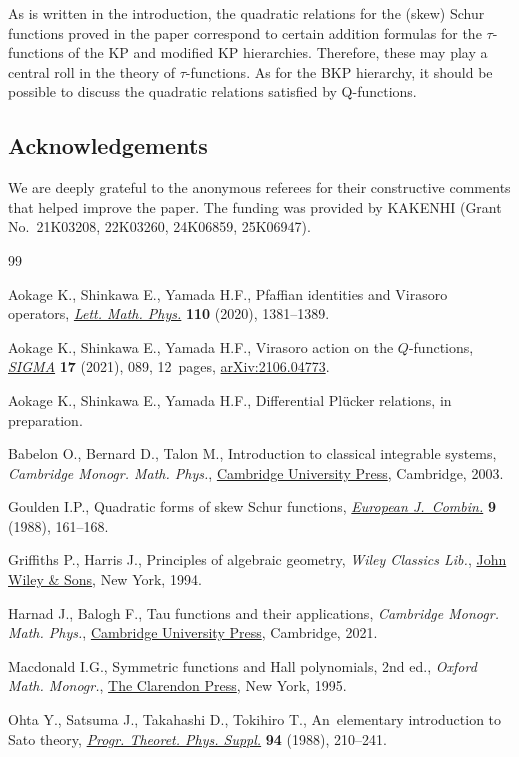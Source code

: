 \documentclass[10pt,a4paper]{amsart}
\numberwithin{equation}{section}
\begin{document}
As is written in the introduction, the quadratic relations for the (skew) Schur functions proved in the paper correspond to certain addition formulas for the $\tau$-functions of the KP and modified KP hierarchies. Therefore, these may play a central roll in the theory of $\tau$-functions. As for the BKP hierarchy, it should be possible to discuss the quadratic relations satisfied by Q-functions.

\subsection*{Acknowledgements}
We are deeply grateful to the anonymous referees for their constructive comments that helped improve the paper. The funding was provided by KAKENHI (Grant No.~21K03208, 22K03260, 24K06859, 25K06947).


\begin{thebibliography}{99}
\footnotesize\itemsep=0pt

Aokage K., Shinkawa E., Yamada H.F., Pfaffian identities and {V}irasoro
 operators, \href{https://doi.org/10.1007/s11005-020-01265-1}{\textit{Lett.
 Math. Phys.}} \textbf{110} (2020), 1381--1389.

Aokage K., Shinkawa E., Yamada H.F., Virasoro action on the {$Q$}-functions,
 \href{https://doi.org/10.3842/SIGMA.2021.089}{\textit{SIGMA}} \textbf{17}
 (2021), 089, 12~pages,
 \href{http://arxiv.org/abs/2106.04773}{arXiv:2106.04773}.

Aokage K., Shinkawa E., Yamada H.F., Differential {P}l\"ucker relations, {i}n
 preparation.

Babelon O., Bernard D., Talon M., Introduction to classical integrable systems,
 \textit{Cambridge Monogr. Math. Phys.},
 \href{https://doi.org/10.1017/CBO9780511535024}{Cambridge University Press},
 Cambridge, 2003.

Goulden I.P., Quadratic forms of skew {S}chur functions,
 \href{https://doi.org/10.1016/S0195-6698(88)80041-6}{\textit{European
 J.~Combin.}} \textbf{9} (1988), 161--168.

Griffiths P., Harris J., Principles of algebraic geometry, \textit{Wiley Classics Lib.},
 \href{https://doi.org/10.1002/9781118032527}{John Wiley \& Sons}, New
 York, 1994.

Harnad J., Balogh F., Tau functions and their applications, \textit{Cambridge Monogr.
 Math. Phys.}, \href{https://doi.org/10.1017/9781108610902}{Cambridge University Press}, Cambridge, 2021.

Macdonald I.G., Symmetric functions and {H}all polynomials, 2nd ed., \textit{Oxford Math. Monogr.}, \href{https://doi.org/10.1093/oso/9780198534891.001.0001}{The Clarendon Press}, New York, 1995.

Ohta Y., Satsuma J., Takahashi D., Tokihiro T., An~elementary introduction to
 {S}ato theory, \href{https://doi.org/10.1143/PTPS.94.210}{\textit{Progr.
 Theoret. Phys. Suppl.}} \textbf{94} (1988), 210--241.

\end{thebibliography}
\end{document}
